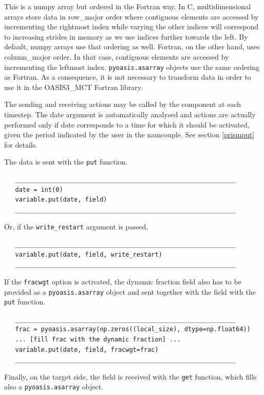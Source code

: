 \begin{itemize}
This is a numpy array but ordered in the Fortran way.
In C, multidimensional arrays store data in row\_major order where
contiguous elements are accessed by incrementing the rightmost index
while varying the other indices will correspond to increasing strides in
memory as we use indices further towards the left. By default, numpy arrays
use that ordering as well. Fortran, on the other hand, uses column\_major
order. In that case, contiguous elements are accessed by incrementing
the leftmost index. {\tt pyoasis.asarray} objects use the same ordering as
Fortran. As a consequence, it is not necessary to transform data in order to
use it in the OASIS3\_MCT Fortran library.

The sending and receiving actions may be called by the component at
each timestep. The date argument is automatically analysed and actions
are actually performed only if date corresponds to a time for which it
should be activated, given the period indicated by the user in the
namcouple. See section  \ref{prismput} for details.

The data is sent with the {\tt put} function.

\begin{verbatim}
   ____________________________________________________________
   date = int(0)
   variable.put(date, field)
   ____________________________________________________________
\end{verbatim}

Or, if the {\tt write\_restart} argument is passed, 

\begin{verbatim}
   ____________________________________________________________
   variable.put(date, field, write_restart)
   ____________________________________________________________
\end{verbatim}

If the {\tt fracwgt} option is activated, the dynamic fraction field also has to be provided as a {\tt pyoasis.asarray} object and sent together with the field with the   {\tt put} function.

\begin{verbatim}
   ____________________________________________________________
   frac = pyoasis.asarray(np.zeros((local_size), dtype=np.float64))
   ... [fill frac with the dynamic fraction] ...
   variable.put(date, field, fracwgt=frac)
   ____________________________________________________________
\end{verbatim}

Finally, on the target side, the field is received with the {\tt get} function, which fills also a {\tt pyoasis.asarray} object.


\end{itemize}
